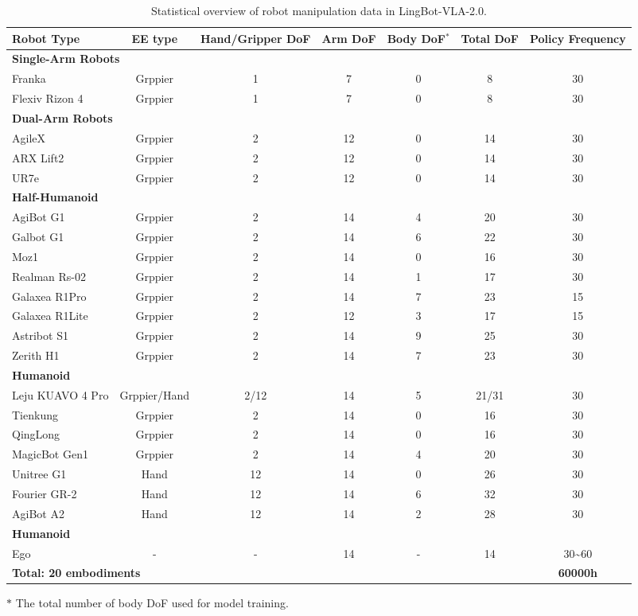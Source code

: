 \begin{table}[t]
\centering
\caption{Statistical overview of robot manipulation data in LingBot-VLA-2.0.}
\label{tab:linbotvla_robot_data}
\small
\setlength{\tabcolsep}{5pt}
\begin{tabular}{lcccccc}
\toprule
Robot Type & EE type &Hand/Gripper DoF & Arm DoF & Body DoF$^{*}$ & Total DoF & Policy Frequency\\
\midrule
\multicolumn{5}{l}{\textbf{Single-Arm Robots}} \\
Franka & Grppier&1&7&0&8&30 \\
Flexiv Rizon 4 & Grppier  &1&7&0&8&30  \\
\midrule
\multicolumn{5}{l}{\textbf{Dual-Arm Robots}} \\
AgileX & Grppier &2&12&0&14&30\\
ARX Lift2& Grppier &2&12&0&14&30\\
UR7e & Grppier  &2&12&0&14&30  \\
\midrule
\multicolumn{5}{l}{\textbf{Half-Humanoid}} \\
AgiBot G1 & Grppier      &2&14&4&20&30 \\
Galbot G1 & Grppier& 2 & 14 & 6& 22 & 30 \\
Moz1 & Grppier  &2&14&0&16&30  \\ 
Realman Rs-02 & Grppier & 2 & 14 & 1 & 17 & 30 \\
Galaxea R1Pro & Grppier & 2 & 14 & 7 & 23 & 15 \\
Galaxea R1Lite & Grppier & 2 & 12 & 3 & 17 & 15 \\
Astribot S1 & Grppier & 2 & 14 & 9 & 25 & 30 \\
Zerith H1 & Grppier & 2 & 14 & 7 & 23 & 30 \\
\midrule
\multicolumn{5}{l}{\textbf{Humanoid}} \\
Leju KUAVO 4 Pro & Grppier/Hand&2/12&14&5&21/31&30 \\
Tienkung & Grppier& 2& 14 & 0 & 16 & 30\\ 
QingLong & Grppier& 2& 14 & 0 & 16 & 30\\ 
MagicBot Gen1&Grppier& 2& 14 & 4 & 20 & 30 \\
Unitree G1 & Hand& 12 & 14 & 0 & 26 & 30  \\
Fourier GR-2 &Hand & 12 & 14 & 6 & 32 &30\\
AgiBot A2 &Hand & 12 & 14 & 2 & 28 & 30 \\
\midrule
\multicolumn{5}{l}{\textbf{Humanoid}} \\
Ego & - &- &14 &- &14  &30\textasciitilde 60 \\
\midrule
\multicolumn{6}{l}{\textbf{Total: 20 embodiments}} & \textbf{60000h} \\
\bottomrule
\end{tabular}
\begin{tablenotes}
\footnotesize
\item[] $*$ The total number of body DoF used for model training.
\end{tablenotes}
\end{table}

